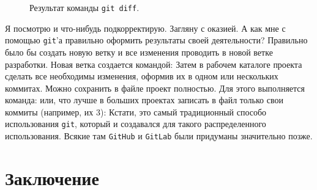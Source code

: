 \documentclass[14pt,a4paper]{article}
\begin{document}
\begin{figure}
	\centering
	\caption{Результат команды \texttt{git diff}.}
	\label{pic-diff-result}
\end{figure}

 Я посмотрю и что-нибудь подкорректирую. Загляну с оказией. 
А как мне с помощью \texttt{git}'а правильно оформить результаты своей деятельности?
 Правильно было бы создать новую ветку и все изменения проводить 
в новой ветке разработки. Новая ветка создается командой:
Затем в рабочем каталоге проекта сделать все необходимы изменения, оформив их в одном
или нескольких коммитах. Можно сохранить в файле проект полностью. Для этого выполняется 
команда:
или, что лучше в больших проектах записать в файл только свои коммиты (например, их 3):
Кстати, это самый традиционный способо использования \texttt{git}, который и создавался
для такого распределенного использования. Всякие там \texttt{GitHub} и \texttt{GitLab}
были придуманы значительно позже.
\section{Заключение}
\end{document}
